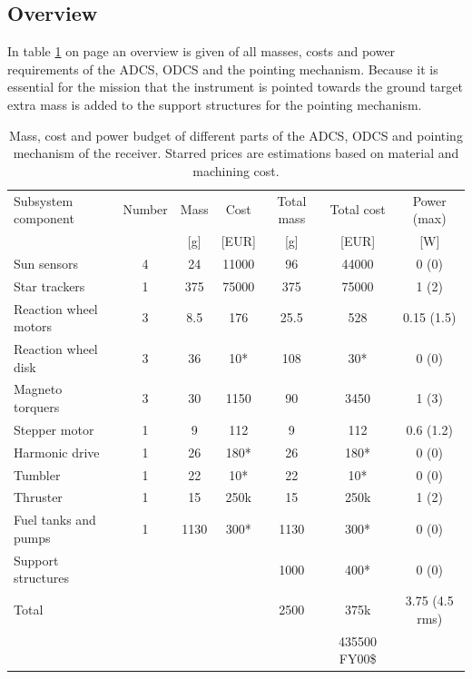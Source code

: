 \subsection{Overview}
\label{ss:recDDoverview}
In table \ref{tab:adcspointbudgetreceiver} on page \pageref{tab:adcspointbudgetreceiver} an overview is given of all masses, costs and power requirements of the \ac{ADCS}, \ac{ODCS} and the pointing mechanism. Because it is essential for the mission that the instrument is pointed towards the ground target extra mass is added to the support structures for the pointing mechanism.
\begin{table}[h]
\begin{tabular}{l | c | c c | c c | c }
Subsystem component    & Number & Mass & Cost & Total mass & Total cost & Power (max)\\ 
                       &   & [g] & [EUR]& [g]  &[EUR] & [W]         \\ \hline \hline
Sun sensors            & 4 & 24  & 11000& 96   & 44000&  0 (0)      \\
Star trackers          & 1 & 375 & 75000& 375  & 75000&  1 (2)      \\ \hline
Reaction wheel motors  & 3 & 8.5 & 176  & 25.5 & 528  &  0.15 (1.5) \\
Reaction wheel disk    & 3 & 36  & 10*  & 108  & 30*  &  0 (0)      \\
Magneto torquers       & 3 & 30  & 1150 & 90   & 3450 &  1 (3)      \\ \hline
Stepper motor          & 1 & 9   & 112  & 9    & 112  &  0.6 (1.2)  \\
Harmonic drive         & 1 & 26  & 180* & 26   & 180* &  0 (0)      \\ 
Tumbler                & 1 & 22  & 10*  & 22   & 10*  &  0 (0)      \\ \hline
Thruster			   & 1 & 15  & 250k & 15   & 250k &  1 (2)      \\
Fuel tanks and pumps   & 1 & 1130 & 300*& 1130  & 300*  & 0 (0)      \\ \hline
Support structures     &	&	 &	    & 1000  & 400* & 0 (0) \\
Total & & &                             & 2500  & 375k & 3.75 (4.5 rms) \\
&&&&& 435500 FY00\$ &
\end{tabular}
\caption[Mass, cost and power budget of AODCS and pointing mechanism receiver]{Mass, cost and power budget of different parts of the \ac{ADCS}, \ac{ODCS} and pointing mechanism of the receiver. Starred prices are estimations based on material and machining cost.}
\label{tab:adcspointbudgetreceiver}
\end{table}